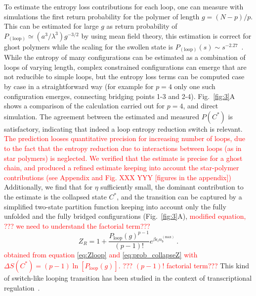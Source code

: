 \documentclass[
preprint,
a4paper,
12pt,
superscriptaddress,
pre]{revtex4}
\newcommand{\rev}[1]{\textcolor{red}{#1}}
\begin{document}
To estimate the entropy loss contributions for each loop, one can
measure with simulations the first return probability for the polymer
of length $g = (N-p)/p$. This can be estimated for large $g$ as return
probability of $P_\mathrm{(loop)} \simeq (a^3/\lambda^3) g^{-3/2}$ by
using mean field theory, this estimation is correct for ghost polymers
while the scaling for the swollen state is $P_\mathrm{(loop)}(s) \sim
s^{-2.27}$~\cite{Marenduzzo2006c}.
%
While the entropy of many configurations can be estimated as a
combination of loops of varying length, complex constrained
configurations can emerge that are not reducible to simple loops, but
the entropy loss terms can be computed case by case in a
straightforward way (for example for $p=4$ only one such configuration
emerges, connecting bridging points 1-3 and 2-4).  Fig.~\ref{fig:3}A
shows a comparison of the calculation carried out for $p=4$, and
direct simulation.  The agreement between the estimated and measured
$P(C^*)$ is satisfactory, indicating that indeed a loop entropy
reduction switch is relevant. \rev{The prediction looses
  quantitative precision for increasing number of loops, due to the
  fact that the entropy reduction due to interactions between loops
  (as in star polymers) is
  neglected. We verified that the estimate is precise for a ghost
  chain, and produced a refined estimate keeping into account the
  star-polymer contributions (see Appendix and Fig. XXX YYY [figures
  in the appendix]) } 
%
Additionally, we find that for $\eta$ sufficiently small, the
dominant contribution to the estimate is the collapsed state $C^*$, and
the transition can be captured by a simplified two-state partition
function keeping into account only the fully unfolded and the fully
bridged configurations (Fig.~\ref{fig:3}A),
\rev{modified equation, ??? we need to understand the factorial term???}
%
%
\begin{equation}
  Z_R = 1 + \frac{P_\mathrm{loop}(g)^{p-1}}
                  {(p-1)!}
            e^{\beta \epsilon_l n_b^{\mathrm{(max)}}} \ .
  \label{eq:Zloop_red}
\end{equation}
\rev{obtained from equation \ref{eq:Zloop} and \ref{eq:prob_collapseZ} with
$\Delta S(C^*) = (p - 1)\ln\left[ P_\mathrm{loop}(g)\right]$.
???  $(p-1)!$ factorial term???}
This kind of switch-like looping transition has been studied in the
context of transcriptional regulation~\cite{Saiz2006a}.
\end{document}

